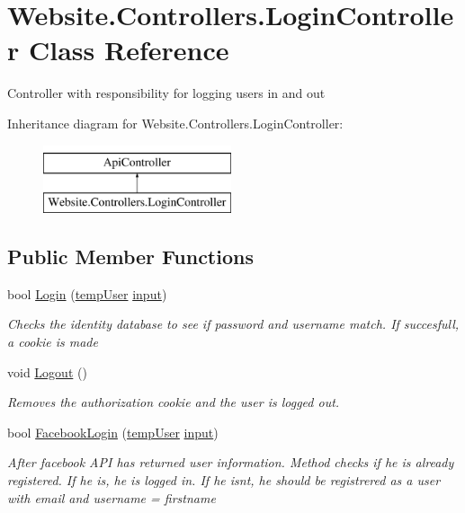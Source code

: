 \hypertarget{class_website_1_1_controllers_1_1_login_controller}{}\section{Website.\+Controllers.\+Login\+Controller Class Reference}
\label{class_website_1_1_controllers_1_1_login_controller}


Controller with responsibility for logging users in and out  


Inheritance diagram for Website.\+Controllers.\+Login\+Controller\+:\begin{figure}[H]
\begin{center}
\leavevmode
\includegraphics[height=2.000000cm]{class_website_1_1_controllers_1_1_login_controller}
\end{center}
\end{figure}
\subsection*{Public Member Functions}
\begin{DoxyCompactItemize}
\item 
bool \hyperlink{class_website_1_1_controllers_1_1_login_controller_a635f20be57cc6bda2319cbd682e8b8f6}{Login} (\hyperlink{class_website_1_1_controllers_1_1temp_user}{temp\+User} \hyperlink{jquery_8unobtrusive-ajax_8min_8js_a22211e450825dd03852dfba097324407}{input})
\begin{DoxyCompactList}\small\item\em Checks the identity database to see if password and username match. If succesfull, a cookie is made \end{DoxyCompactList}\item 
void \hyperlink{class_website_1_1_controllers_1_1_login_controller_acd61a9feab4ae21195bc64fc8b220f9a}{Logout} ()
\begin{DoxyCompactList}\small\item\em Removes the authorization cookie and the user is logged out. \end{DoxyCompactList}\item 
bool \hyperlink{class_website_1_1_controllers_1_1_login_controller_a0049c343d18bab0da7d8fb5ba1d35a9a}{Facebook\+Login} (\hyperlink{class_website_1_1_controllers_1_1temp_user}{temp\+User} \hyperlink{jquery_8unobtrusive-ajax_8min_8js_a22211e450825dd03852dfba097324407}{input})
\begin{DoxyCompactList}\small\item\em After facebook A\+P\+I has returned user information. Method checks if he is already registered. If he is, he is logged in. If he isnt, he should be registrered as a user with email and username = firstname \end{DoxyCompactList}\end{DoxyCompactItemize}


